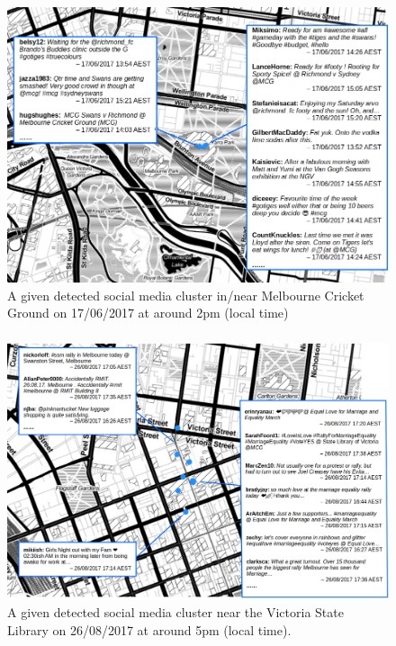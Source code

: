 \begin{frame}
    \frametitle{}
    \begin{figure}		  
    	\includegraphics[width=0.88\columnwidth]{resource/figures/cluster_1e.png}
    	\centering
    	\vspace{-0.2cm}
    	\caption{\tiny A given detected social media cluster in/near Melbourne Cricket Ground on 17/06/2017 at around 2pm (local time)}
    \end{figure}
\end{frame}

\begin{frame}
    \frametitle{}
    \begin{figure}		  
    	\includegraphics[width=0.95\columnwidth]{resource/figures/cluster_2e.png}
    	\centering
    	\vspace{-0.2cm}
    	\caption{\tiny A given detected social media cluster near the Victoria State Library on 26/08/2017 at around 5pm (local time).}
    \end{figure}
\end{frame}

